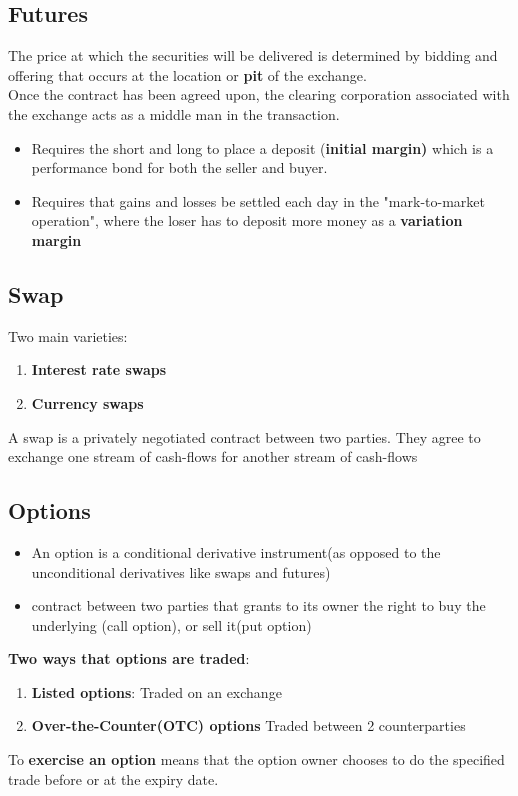 \documentclass{article}
\theoremstyle{definition}
\theoremstyle{thrm}
\theoremstyle{lma}
\theoremstyle{ppst}
\theoremstyle{crlr}
\begin{document}
\subsection{Futures}
The price at which the securities will be delivered is determined by bidding and offering that occurs at the location or \textbf{pit} of the exchange.\\
Once the contract has been agreed upon, the clearing corporation associated with the exchange acts as a middle man in the transaction.
\begin{itemize}
	\item Requires the short and long to place a deposit (\textbf{initial margin)} which is a performance bond for both the seller and buyer.
	\item Requires that gains and losses be settled each day in the "mark-to-market operation", where the loser has to deposit more money as a \textbf{variation margin} 
\end{itemize}
\subsection{Swap}
Two main varieties:
\begin{enumerate}
	\item \textbf{Interest rate swaps}
	\item \textbf{Currency swaps}
\end{enumerate}
A swap is a privately negotiated contract between two parties. They agree to exchange one stream of cash-flows for another stream of cash-flows
\subsection{Options}
\begin{itemize}
	\item An option is a conditional derivative instrument(as opposed to the unconditional derivatives like swaps and futures)
	\item contract between two parties that grants to its owner the right to buy the underlying (call option), or sell it(put option)
\end{itemize}
\textbf{Two ways that options are traded}:
\begin{enumerate}
	\item \textbf{Listed options}: Traded on an exchange
	\item \textbf{Over-the-Counter(OTC) options} Traded between 2 counterparties
\end{enumerate}
To \textbf{exercise an option} means that the option owner chooses to do the specified trade before or at the expiry date.
\end{document}
